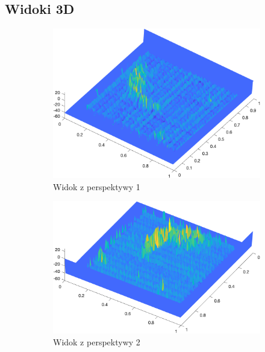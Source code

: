 \documentclass{article}
\begin{document}
\subsection{Widoki 3D}
\begin{figure}[H]
    \centering
    \begin{subfigure}[b]{0.45\textwidth}
        \includegraphics[width=\textwidth]{3D_1.png}
        \caption{Widok z perspektywy 1}
    \end{subfigure}
    \begin{subfigure}[b]{0.45\textwidth}
        \includegraphics[width=\textwidth]{3D_2.png}
        \caption{Widok z perspektywy 2}
    \end{subfigure}
    \begin{subfigure}[b]{0.45\textwidth}

\end{subfigure}
\end{figure}
\end{document}
